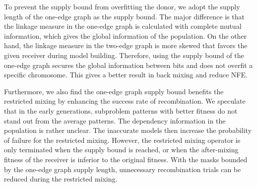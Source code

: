 \documentclass{sig-alternate-05-2015}
\begin{document}
To prevent the supply bound from overfitting the donor, we adopt the supply length of the one-edge graph as the supply bound. The major difference is that the linkage measure in the one-edge graph is calculated with complete mutual information, which gives the global information of the population. On the other hand, the linkage measure in the two-edge graph is more skewed that favors the given receiver during model building. Therefore, using the supply bound of the one-edge graph secures the global information between bits and does not overfit a specific chromosome. This gives a better result in back mixing and reduce NFE.


Furthermore, we also find the one-edge graph supply bound benefits the restricted mixing by enhancing the success rate of recombination. We speculate that in the early generations, subproblem patterns with better fitness do not stand out from the average patterns. The dependency information in the population is rather unclear. The inaccurate models then increase the probability of failure for the restricted mixing. However, the restricted mixing operator is only terminated when the supply bound is reached, or when the after-mixing fitness of the receiver is inferior to the original fitness. With the masks bounded by the one-edge graph supply length, unnecessary recombination trials can be reduced during the restricted mixing. 

\end{document}
